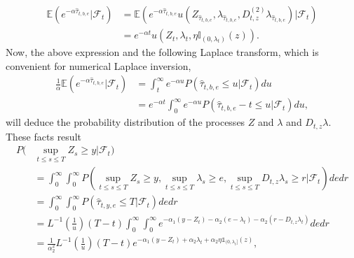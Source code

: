 \documentclass[11pt]{article}
\numberwithin{equation}{section}
\begin{document}
\begin{align*}
\mathbb{E}(e^{-\alpha \hat{\tau}_{t,b,e}}\vert \mathcal{F}_t)&= \mathbb{E}(e^{-\alpha {\hat{\tau}_{t,b,e}}} u(Z_{\hat{\tau}_{t,b,e}}, \lambda_{\hat{\tau}_{t,b,e}}, D_{t,z}^{(2)}\lambda_{\hat{\tau}_{t,b,e}}) \vert \mathcal{F}_t)\\
& =e^{-\alpha t} u(Z_{t}, \lambda_{t}, \eta \mathbb{I}_{(0, \lambda_t)}(z)).
\end{align*}
Now, the above expression and the following Laplace transform, which is convenient for numerical Laplace inversion, 
\begin{align*}
\frac{1}{\alpha} \mathbb{E} (e^{-\alpha \hat{\tau}_{t,b,e}}\vert \mathcal{F}_t) &= \int_t^\infty e^{-\alpha u} P(\hat{\tau}_{t,b,e} \leq u \vert \mathcal{F}_t) du \\
&= e^{-\alpha t} \int_0^\infty e^{-\alpha u} P(\hat{\tau}_{t,b,e}-t \leq u \vert \mathcal{F}_t) du,
\end{align*}   
will deduce the probability distribution of the processes $Z$ and $\lambda$ and $D_{t,z}\lambda$. These facts result
\begin{align*}
P(&\sup_{t \leq s \leq T}Z_s \geq y  \vert \mathcal{F}_t)\\
&= \int_0^\infty \int_0^\infty  P(\sup_{t \leq s \leq T}Z_s \geq y , \sup_{t \leq s \leq T} \lambda_s \geq e, \sup_{t \leq s \leq T} D_{t,z}\lambda_s \geq r\vert \mathcal{F}_t) dedr \\
&=\int_0^\infty  \int_0^\infty  P(\hat{\tau}_{t,y,e} \leq T \vert \mathcal{F}_t ) de dr\\
&=   L^{-1}(\frac{1}{u})(T-t)    \int_0^\infty \int_0^\infty e^{-\alpha_1 (y-Z_t) -\alpha_2(e-\lambda_t)-\alpha_2(r-D_{t,z}\lambda_t)} dedr\\
&=  \frac{1}{\alpha_2^2} L^{-1}(\frac{1}{u})(T-t)  e^{-\alpha_1 (y-Z_t) +\alpha_2\lambda_t+\alpha_2\eta\mathbb{1}_{(0,\lambda_t]}(z)},
\end{align*}
\end{document}
